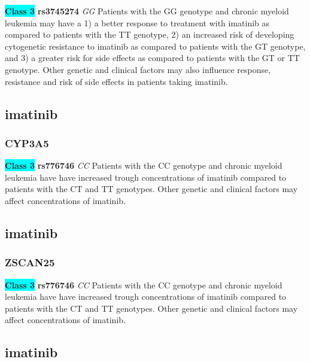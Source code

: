 \documentclass{book}
\begin{document}
\begin{center}
\textbf{\colorbox{cyan} {Class 3}} \textbf{ rs3745274 } \textit{ GG }
Patients with the GG genotype and chronic myeloid leukemia may have a 1) a better response to treatment with imatinib as compared to patients with the TT genotype, 2) an increased risk of developing cytogenetic resistance to imatinib as compared to patients with the GT genotype, and 3) a greater risk for side effects as compared to patients with the GT or TT genotype. Other genetic and clinical factors may also influence response, resistance and risk of side effects in patients taking imatinib.


\end{center}\subsection{ imatinib }


\subsubsection{ CYP3A5 }

\begin{center}
\textbf{\colorbox{cyan} {Class 3}} \textbf{ rs776746 } \textit{ CC }
Patients with the CC genotype and chronic myeloid leukemia have have increased trough concentrations of imatinib compared to patients with the CT and TT genotypes. Other genetic and clinical factors may affect concentrations of imatinib.


\end{center}\subsection{ imatinib }


\subsubsection{ ZSCAN25 }

\begin{center}
\textbf{\colorbox{cyan} {Class 3}} \textbf{ rs776746 } \textit{ CC }
Patients with the CC genotype and chronic myeloid leukemia have have increased trough concentrations of imatinib compared to patients with the CT and TT genotypes. Other genetic and clinical factors may affect concentrations of imatinib.


\end{center}\subsection{ imatinib }
\end{document}
